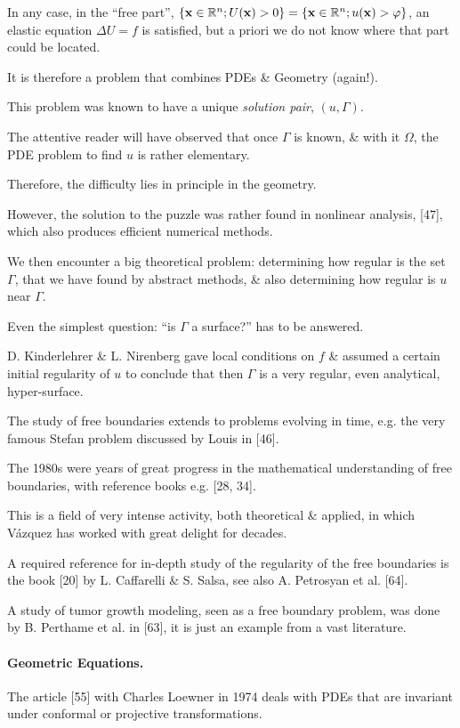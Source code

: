 \documentclass{article}
\begin{document}
%
In any case, in the ``free part'', $\{{\bf x}\in\mathbb{R}^n;U({\bf x}) > 0\} = \{{\bf x}\in\mathbb{R}^n;u({\bf x}) > \varphi\}$, an elastic equation $\Delta U = f$ is satisfied, but a priori we do not know where that part could be located.

It is therefore a problem that combines PDEs \& Geometry (again!).

%
This problem was known to have a unique \textit{solution pair}, $(u,\Gamma)$.

The attentive reader will have observed that once $\Gamma$ is known, \& with it $\Omega$, the PDE problem to find $u$ is rather elementary.

Therefore, the difficulty lies in principle in the geometry.

However, the solution to the puzzle was rather found in nonlinear analysis, [47], which also produces efficient numerical methods.

%
We then encounter a big theoretical problem: determining how regular is the set $\Gamma$, that we have found by abstract methods, \& also determining how regular is $u$ near $\Gamma$.

Even the simplest question: ``is $\Gamma$ a surface?'' has to be answered.

D. Kinderlehrer \& L. Nirenberg gave local conditions on $f$ \& assumed a certain initial regularity of $u$ to conclude that then $\Gamma$ is a very regular, even analytical, hyper-surface.

The study of free boundaries extends to problems evolving in time, e.g. the very famous Stefan problem discussed by Louis in [46].

The 1980s were years of great progress in the mathematical understanding of free boundaries, with reference books e.g. [28, 34].

%
This is a field of very intense activity, both theoretical \& applied, in which V\'azquez has worked with great delight for decades.

A required reference for in-depth study of the regularity of the free boundaries is the book [20] by L. Caffarelli \& S. Salsa, see also A. Petrosyan et al. [64].

A study of tumor growth modeling, seen as a free boundary problem, was done by B. Perthame et al. in [63], it is just an example from a vast literature.

\paragraph{Geometric Equations.} The article [55] with Charles Loewner in 1974 deals with PDEs that are invariant under conformal or projective transformations.
\end{document}
